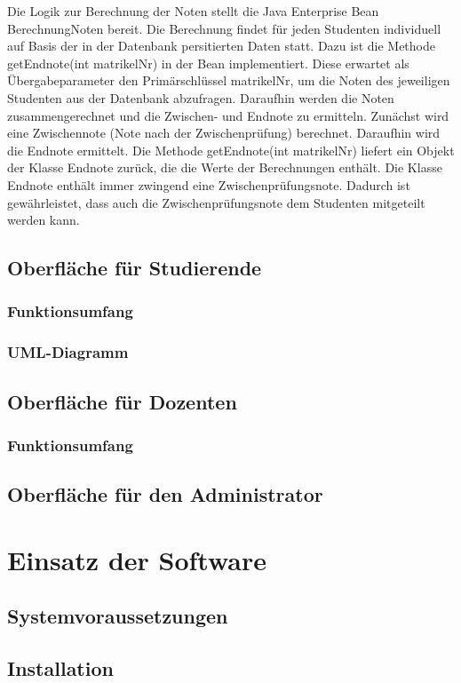 \documentclass[12pt,a4paper,parskip]{scrreprt}
\begin{document}
Die Logik zur Berechnung der Noten stellt die Java Enterprise Bean BerechnungNoten bereit. Die Berechnung findet für jeden Studenten individuell auf Basis der in der Datenbank persitierten Daten statt. 
Dazu ist die Methode getEndnote(int matrikelNr) in der Bean implementiert. Diese erwartet als Übergabeparameter den Primärschlüssel matrikelNr, um die Noten des jeweiligen Studenten aus der Datenbank abzufragen. Daraufhin werden die Noten zusammengerechnet und die Zwischen- und Endnote zu ermitteln.
Zunächst wird eine Zwischennote (Note nach der Zwischenprüfung) berechnet. Daraufhin wird die Endnote ermittelt.
Die Methode getEndnote(int matrikelNr) liefert ein Objekt der Klasse Endnote zurück, die die Werte der Berechnungen enthält. Die Klasse Endnote enthält immer zwingend eine Zwischenprüfungsnote. Dadurch ist gewährleistet, dass auch die Zwischenprüfungsnote dem Studenten mitgeteilt werden kann.

\section{Oberfläche für Studierende}
\subsection{Funktionsumfang}
\subsection{UML-Diagramm}
\section{Oberfläche für Dozenten}
\subsection{Funktionsumfang}
\section{Oberfläche für den Administrator}
\chapter{Einsatz der Software}
\section{Systemvoraussetzungen}
\section{Installation}
\end{document}
